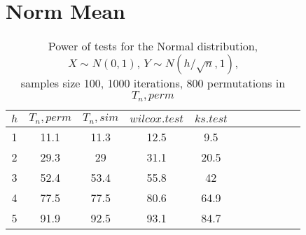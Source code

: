 \documentclass{report}
\begin{document}
\section*{Norm Mean}

\begin{longtable}{|c|c|c|c|c|c|c|c|c|c|c|}
  \caption{Power of tests for the Normal distribution, \\
           $X\sim N(0,1)$, $Y\sim N(h/\sqrt{n},1)$, \\
           samples size 100, 1000 iterations, 800 permutations in $T_n, perm$} \\
  \hline
  $h$ & $T_n, perm$ & $T_n, sim$ & $wilcox.test$ & $ks.test$ \\ \hline
  1 & 11.1 & 11.3 & 12.5 & 9.5 \\
  2 & 29.3 & 29 & 31.1 & 20.5 \\
  3 & 52.4 & 53.4 & 55.8 & 42 \\
  4 & 77.5 & 77.5 & 80.6 & 64.9 \\
  5 & 91.9 & 92.5 & 93.1 & 84.7 \\
  \hline
\end{longtable}

\end{document}
